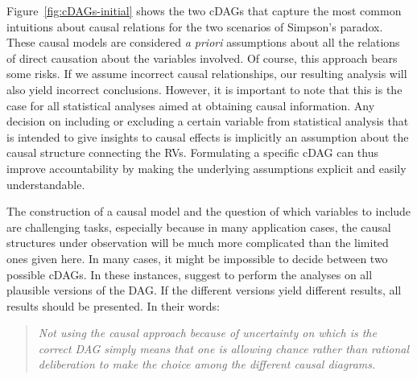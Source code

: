 \documentclass[nobib]{tufte-handout}
\begin{document}
Figure~\ref{fig:cDAGs-initial} shows the two cDAGs that capture the most common intuitions about causal relations for the two scenarios of Simpson's paradox.
These causal models are considered \textit{a priori} assumptions about all the relations of direct causation about the variables involved.
Of course, this approach bears some risks.
If we assume incorrect causal relationships, our resulting analysis will also yield incorrect conclusions.
However, it is important to note that this is the case for all statistical analyses aimed at obtaining causal information.
Any decision on including or excluding a certain variable from statistical analysis that is intended to give insights to causal effects is implicitly an assumption about the causal structure connecting the RVs.
Formulating a specific cDAG can thus improve accountability by making the underlying assumptions explicit and easily understandable.

The construction of a causal model and the question of which variables to include are challenging tasks, especially because in many application cases, the causal structures under observation will be much more complicated than the limited ones given here.
In many cases, it might be impossible to decide between two possible cDAGs.
In these instances, \citet{shrier2008reducing} suggest to perform the analyses on all plausible versions of the DAG.
If the different versions yield different results, all results should be presented. 
In their words: 
\begin{quote}
  \emph{Not using the causal approach because of uncertainty on which is the correct DAG simply means that one is allowing chance rather than rational deliberation to make the choice among the different causal diagrams.}
\end{quote}
\end{document}
